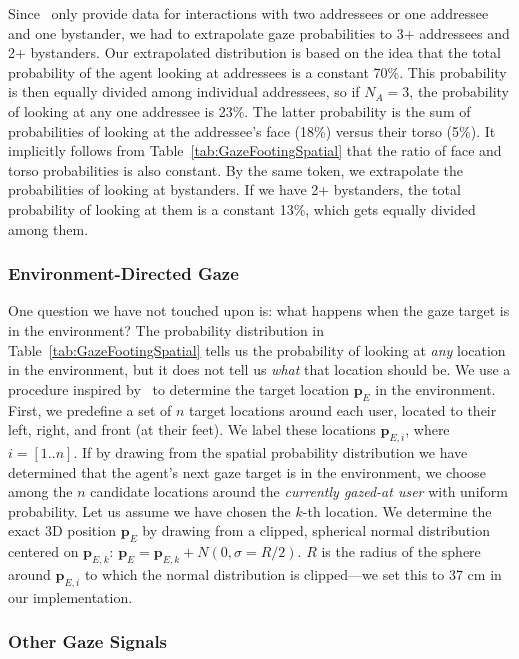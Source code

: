 Since~\citet{mutlu2012conversational} only provide data for interactions with two addressees or one addressee and one bystander, we had to extrapolate gaze probabilities to 3+ addressees and 2+ bystanders. Our extrapolated distribution is based on the idea that the total probability of the agent looking at addressees is a constant 70\%. This probability is then equally divided among individual addressees, so if $N_A = 3$, the probability of looking at any one addressee is 23\%. The latter probability is the sum of probabilities of looking at the addressee's face (18\%) versus their torso (5\%). It implicitly follows from Table~\ref{tab:GazeFootingSpatial} that the ratio of face and torso probabilities is also constant. By the same token, we extrapolate the probabilities of looking at bystanders. If we have 2+ bystanders, the total probability of looking at them is a constant 13\%, which gets equally divided among them.

\subsubsection{Environment-Directed Gaze}

One question we have not touched upon is: what happens when the gaze target is in the environment? The probability distribution in Table~\ref{tab:GazeFootingSpatial} tells us the probability of looking at \emph{any} location in the environment, but it does not tell us \emph{what} that location should be. We use a procedure inspired by~\citet{mutlu2012conversational} to determine the target location $\mathbf{p}_E$ in the environment. First, we predefine a set of $n$ target locations around each user, located to their left, right, and front (at their feet). We label these locations $\mathbf{p}_{E,i}$, where $i = [1..n]$. If by drawing from the spatial probability distribution we have determined that the agent's next gaze target is in the environment, we choose among the $n$ candidate locations around the \emph{currently gazed-at user} with uniform probability. Let us assume we have chosen the $k$-th location. We determine the exact 3D position $\mathbf{p}_E$ by drawing from a clipped, spherical normal distribution centered on $\mathbf{p}_{E,k}$: $\mathbf{p}_E = \mathbf{p}_{E,k} + N(0, \sigma = R/2)$. $R$ is the radius of the sphere around $\mathbf{p}_{E,i}$ to which the normal distribution is clipped---we set this to 37 cm in our implementation.

\subsubsection{Other Gaze Signals}

